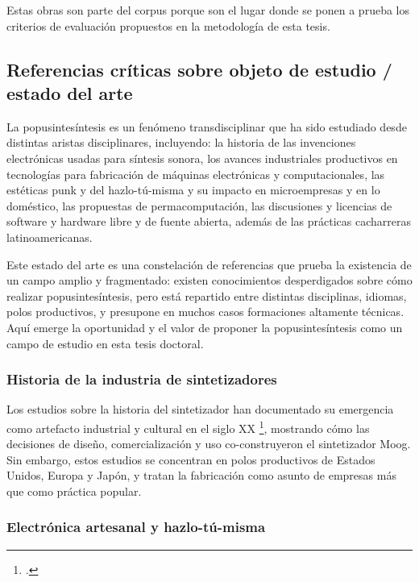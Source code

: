 \documentclass[../candidatura.tex]{subfiles}
\begin{document}
Estas obras son parte del corpus porque son el lugar donde se ponen a prueba los criterios de evaluación propuestos en la metodología de esta tesis.

\subsection{Referencias críticas sobre objeto de estudio / estado del arte}

La popusintesíntesis es un fenómeno transdisciplinar que ha sido estudiado desde distintas aristas disciplinares, incluyendo: la historia de las invenciones electrónicas usadas para síntesis sonora, los avances industriales productivos en tecnologías para fabricación de máquinas electrónicas y computacionales, las estéticas punk y del hazlo-tú-misma y su impacto en microempresas y en lo doméstico, las propuestas de permacomputación, las discusiones y licencias de software y hardware libre y de fuente abierta, además de las prácticas cacharreras latinoamericanas.

Este estado del arte es una constelación de referencias que prueba la existencia de un campo amplio y fragmentado: existen conocimientos desperdigados sobre cómo realizar popusintesíntesis, pero está repartido entre distintas disciplinas, idiomas, polos productivos, y presupone en muchos casos formaciones altamente técnicas. Aquí emerge la oportunidad y el valor de proponer la popusintesíntesis como un campo de estudio en esta tesis doctoral.

\subsubsection{Historia de la industria de sintetizadores}

Los estudios sobre la historia del sintetizador han documentado su emergencia como artefacto industrial y cultural en el siglo XX \footcite{pinch_analog_2002}, mostrando cómo las decisiones de diseño, comercialización y uso co-construyeron el sintetizador Moog. Sin embargo, estos estudios se concentran en polos productivos de Estados Unidos, Europa y Japón, y tratan la fabricación como asunto de empresas más que como práctica popular.

\subsubsection{Electrónica artesanal y hazlo-tú-misma}
\end{document}

